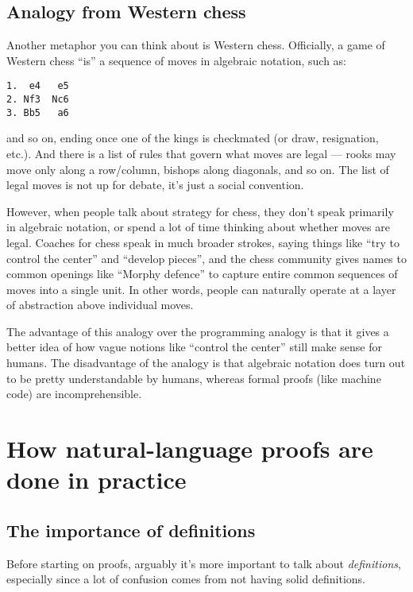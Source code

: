 \documentclass[11pt]{scrartcl}
\begin{document}
\subsection{Analogy from Western chess}
Another metaphor you can think about is Western chess.
Officially, a game of Western chess ``is''
a sequence of moves in algebraic notation, such as:
\begin{lstlisting}[basicstyle=\normalsize\ttfamily]
1.  e4   e5
2. Nf3  Nc6
3. Bb5   a6
\end{lstlisting}
and so on,
ending once one of the kings is checkmated (or draw, resignation, etc.).
And there is a list of rules that govern what moves are legal --- rooks
may move only along a row/column, bishops along diagonals, and so on.
The list of legal moves is not up for debate, it's just a social convention.

However, when people talk about strategy for chess,
they don't speak primarily in algebraic notation,
or spend a lot of time thinking about whether moves are legal.
Coaches for chess speak in much broader strokes,
saying things like ``try to control the center'' and ``develop pieces'',
and the chess community gives names to common openings like ``Morphy defence''
to capture entire common sequences of moves into a single unit.
In other words, people can naturally operate
at a layer of abstraction above individual moves.

The advantage of this analogy over the programming analogy is that
it gives a better idea of how vague notions
like ``control the center'' still make sense for humans.
The disadvantage of the analogy is that algebraic notation does
turn out to be pretty understandable by humans,
whereas formal proofs (like machine code) are incomprehensible.

\section{How natural-language proofs are done in practice}
\label{sec:practice}

\subsection{The importance of definitions}
Before starting on proofs,
arguably it's more important to talk about \emph{definitions},
especially since a lot of confusion comes from not having solid definitions.
\end{document}
